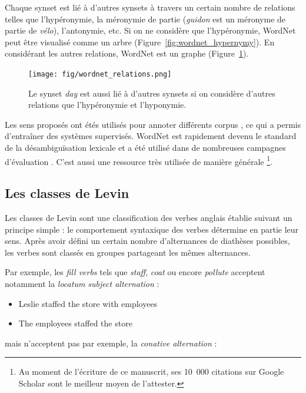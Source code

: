 Chaque synset est lié à d'autres synsets à travers un certain nombre de
relations telles que l'hypéronymie, la méronymie de partie (\emph{guidon} est
un méronyme de partie de \emph{vélo}), l'antonymie, etc. Si on ne considère que
l'hypéronymie, WordNet peut être visualisé comme un arbre
(Figure~\ref{fig:wordnet_hypernymy}). En considérant les autres relations,
WordNet est un graphe (Figure~\ref{fig:wordnet_relations}).

\begin{figure}[t]
    \centering
    \texttt{[image: fig/wordnet\_relations.png]}
    \caption{\label{fig:wordnet_relations} Le synset \emph{day} est aussi lié à
        d'autres synsets si on considère d'autres relations que l'hypéronymie et
        l'hyponymie.}
\end{figure}

Les sens proposés ont étés utilisés pour annoter différents corpus
\citep{petrolito2014survey}, ce qui a permis d'entraîner des systèmes
supervisés. WordNet est rapidement devenu le standard de la désambiguïsation
lexicale et a été utilisé dans de nombreuses campagnes d'évaluation
\citep{navigli2009word}. C'est aussi une ressource très utilisée de manière
générale \footnote{Au moment de l'écriture de ce manuscrit, ses 10~000
    citations sur Google Scholar sont le meilleur moyen de l'attester.}.

\subsection{Les classes de Levin}

Les classes de Levin \citep{levin1993english} sont une classification des
verbes anglais établie suivant un principe simple : le comportement syntaxique
des verbes détermine en partie leur sens. Après avoir défini un certain nombre
d'alternances de diathèses possibles, les verbes sont classés en groupes
partageant les mêmes alternances.

Par exemple, les \emph{fill verbs} tels que \emph{staff}, \emph{coat} ou encore
\emph{pollute} acceptent notamment la \emph{locatum subject alternation} :

\begin{itemize}
    \item Leslie staffed the store with employees
    \item The employees staffed the store
\end{itemize}

mais n'acceptent pas par exemple, la \emph{conative alternation} :


